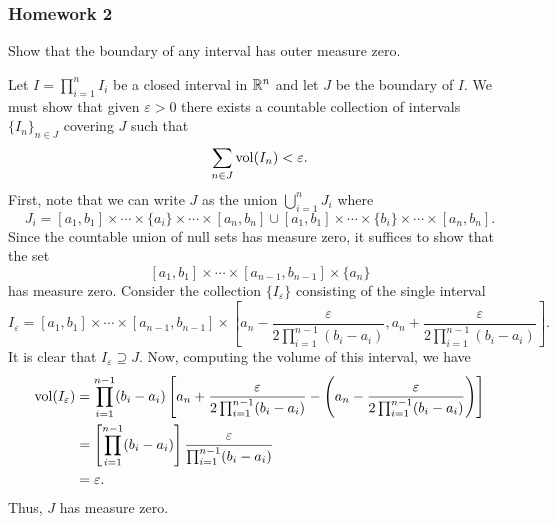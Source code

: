 \subsubsection{Homework 2}
\setcounter{exercise}{0}
\setcounter{equation}{0}

\begin{problem}
  Show that the boundary of any interval has outer measure zero.
\end{problem}
\begin{solution}
  Let $I=\prod_{i=1}^n I_i$ be a closed interval in $\mathbb{R}^n$ and let
  $J$ be the boundary of $I$. We must show that given $\varepsilon>0$ there
  exists a countable collection of intervals $\{I_n\}_{n\in J}$ covering
  $J$ such that
  \[
    \sum_{n\in J}\operatorname{vol}(I_n)<\varepsilon.
  \]
  First, note that we can write $J$ as the union $\bigcup_{i=1}^n J_i$
  where
  \[
    J_i=%
      [a_1,b_1]\times\cdots\times\{a_i\}\times\cdots\times[a_n,b_n]%
    \cup
    [a_1,b_1]\times\cdots\times\{b_i\}\times\cdots\times[a_n,b_n].
  \]
  Since the countable union of null sets has measure zero, it suffices to
  show that the set
  \[
    [a_1,b_1]\times\cdots\times[a_{n-1},b_{n-1}]\times\{a_n\}%
  \]
  has measure zero. Consider the collection $\{I_\varepsilon\}$ consisting
  of the single interval
  \[
    I_\varepsilon= [a_1,b_1]\times\cdots\times[a_{n-1},b_{n-1}]
    \times\left[a_n-\frac{\varepsilon}{2\prod_{i=1}^{n-1}(b_i-a_i)},
      a_n+\frac{\varepsilon}{2\prod_{i=1}^{n-1}(b_i-a_i)}\right].
  \]
  It is clear that $I_\varepsilon\supseteq J$. Now, computing the volume of
  this interval, we have
  \begin{align*}
    \vol(I_\varepsilon)%
    &=\prod_{i=1}^{n-1}(b_i-a_i)%
    \left[%
    a_n+\frac{\varepsilon}{2\prod_{i=1}^{n-1}(b_i-a_i)}%
    -\left(%
    a_n -\frac{\varepsilon}{2\prod_{i=1}^{n-1}(b_i-a_i)} \right)
    \right]\\
    &=\left[\prod_{i=1}^{n-1}(b_i-a_i)\right]%
      \frac{\varepsilon}{\prod_{i=1}^{n-1}(b_i-a_i)}\\
    &=\varepsilon.
  \end{align*}
  Thus, $J$ has measure zero.
\end{solution}

